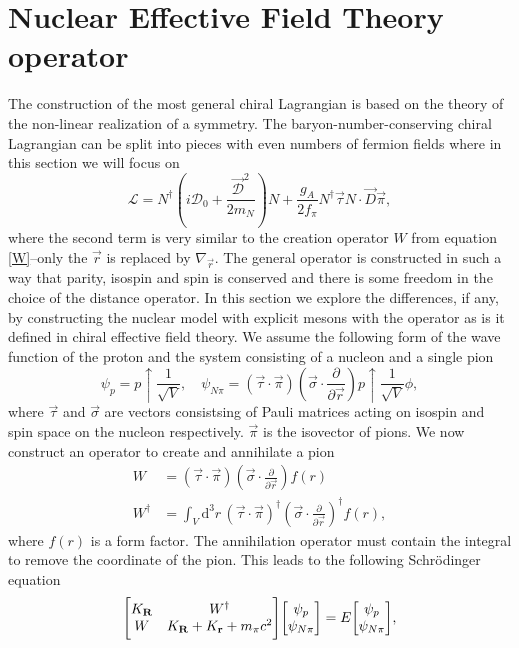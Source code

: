 \section{Nuclear Effective Field Theory operator}
The construction of the most general chiral Lagrangian is based on the theory of the non-linear realization of a symmetry. The baryon-number-conserving chiral Lagrangian can be split into pieces with even numbers of fermion fields where in this section we will focus on 
\begin{equation}
    \mathcal{L} = N^\dagger \left(i\mathcal{D}_0+\frac{\vec{\mathcal{D}}^2}{2m_N} \right)N+\frac{g_A}{2f_\pi}N^\dagger\vec{\tau}N\cdot \vec{D}\vec{\pi},
\end{equation}
where the second term is very similar to the creation operator $W$ from equation \eqref{W}--only the $\vec{r}$ is replaced by $\nabla_{\vec{r}}$. The general operator is constructed in such a way that parity, isospin and spin is conserved and there is some freedom in the choice of the distance operator. In this section we explore the differences, if any, by constructing the nuclear model with explicit mesons with the operator as is it defined in chiral effective field theory. We assume the following form of the wave function of the proton and the system consisting of a nucleon and a single pion
\begin{equation}
    \psi_p = p\uparrow\frac{1}{\sqrt{V}}, \quad \psi_{N\pi} = (\vec{\tau}\cdot \vec{\pi})(\vec{\sigma}\cdot \frac{\partial}{\partial\vec{r}})p\uparrow \frac{1}{\sqrt{V}}\phi,
\end{equation}
where $\vec{\tau}$ and $\vec{\sigma}$ are vectors consistsing of Pauli matrices acting on isospin and spin space on the nucleon respectively. $\vec{\pi}$ is the isovector of pions. We now construct an operator to create and annihilate a pion
\begin{align}
    W & = (\vec{\tau}\cdot \vec{\pi})(\vec{\sigma}\cdot \frac{\partial}{\partial\vec{r}})f(r) \\
    W^\dagger & = \int_V \text{d}^3 r \, (\vec{\tau}\cdot \vec{\pi})^\dagger(\vec{\sigma}\cdot \frac{\partial}{\partial\vec{r}})^\dagger f(r),
\end{align}
where $f(r)$ is a form factor. The annihilation operator must contain the integral to remove the coordinate of the pion. This leads to the following Schrödinger equation
\begin{equation}
    \mqty[K_{\vec{R}} & W^\dagger \\ W & K_{\vec{R}}+K_{\vec{r}}+m_\pi c^2]\mqty[\psi_p \\ \psi_{N\pi}]=E\mqty[\psi_p \\ \psi_{N\pi}],
\end{equation}
